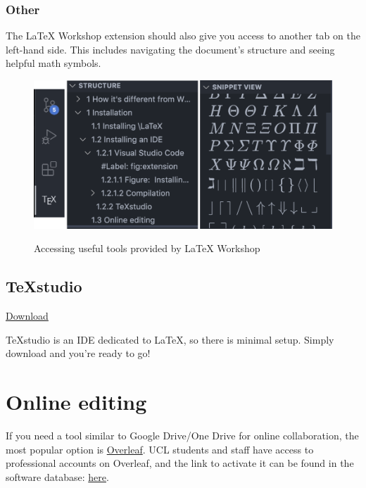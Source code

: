 \subsubsection{Other}
The LaTeX Workshop extension should also give you access to another tab on the left-hand side.
This includes navigating the document's structure and seeing helpful math symbols.
\begin{figure}[h]
\centering
    \includegraphics[width=\textwidth]{figures/symbols.png}
\label{fig:symbols}
\caption{Accessing useful tools provided by LaTeX Workshop}
\end{figure}

\subsection{TeXstudio}
\href{https://www.texstudio.org/}{Download}

TeXstudio is an IDE dedicated to \LaTeX{}, so there is minimal setup. Simply download and you're ready to go!

\section{Online editing}
If you need a tool similar to Google Drive/One Drive for online collaboration, the most popular option is \href{https://www.overleaf.com/}{Overleaf}.
UCL students and staff have access to professional accounts on Overleaf, and the link to activate it can be found in the software database: \href{https://swdb.ucl.ac.uk/package/view/id/1235}{here}.
